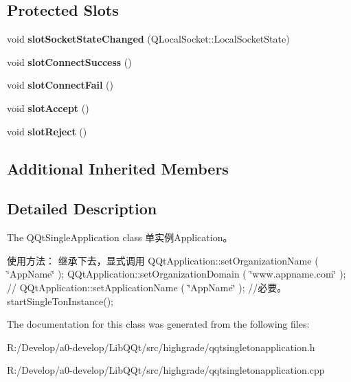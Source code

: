 \subsection*{Protected Slots}
\begin{DoxyCompactItemize}
\item 
\mbox{\label{class_q_qt_single_ton_application_af784bf49fb809170ad8de85528346ecc}} 
void {\bfseries slot\+Socket\+State\+Changed} (Q\+Local\+Socket\+::\+Local\+Socket\+State)
\item 
\mbox{\label{class_q_qt_single_ton_application_a9c772d890a655693523530deffc8d48e}} 
void {\bfseries slot\+Connect\+Success} ()
\item 
\mbox{\label{class_q_qt_single_ton_application_a9a48d25dd5a3a404f6016346605f5791}} 
void {\bfseries slot\+Connect\+Fail} ()
\item 
\mbox{\label{class_q_qt_single_ton_application_aa6cf6691a415a9b5f90a6d9e2ef2a506}} 
void {\bfseries slot\+Accept} ()
\item 
\mbox{\label{class_q_qt_single_ton_application_af604328c53637805e49679718e830130}} 
void {\bfseries slot\+Reject} ()
\end{DoxyCompactItemize}
\subsection*{Additional Inherited Members}


\subsection{Detailed Description}
The Q\+Qt\+Single\+Application class 单实例\+Application。 

使用方法： 继承下去，显式调用 Q\+Qt\+Application\+::set\+Organization\+Name ( \char`\"{}\+App\+Name\char`\"{} ); Q\+Qt\+Application\+::set\+Organization\+Domain ( \char`\"{}www.\+appname.\+com\char`\"{} ); // Q\+Qt\+Application\+::set\+Application\+Name ( \char`\"{}\+App\+Name\char`\"{} ); //必要。 start\+Single\+Ton\+Instance(); 

The documentation for this class was generated from the following files\+:\begin{DoxyCompactItemize}
\item 
R\+:/\+Develop/a0-\/develop/\+Lib\+Q\+Qt/src/highgrade/qqtsingletonapplication.\+h\item 
R\+:/\+Develop/a0-\/develop/\+Lib\+Q\+Qt/src/highgrade/qqtsingletonapplication.\+cpp\end{DoxyCompactItemize}
